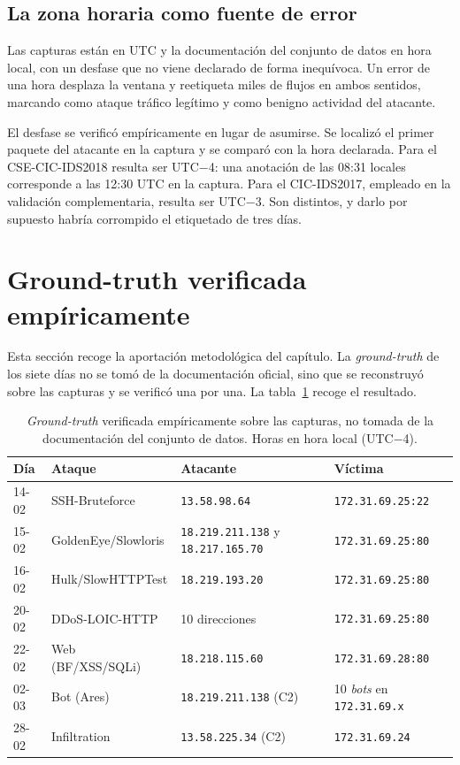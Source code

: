 \subsection*{La zona horaria como fuente de error}

Las capturas están en UTC y la documentación del conjunto de datos en hora local,
con un desfase que no viene declarado de forma inequívoca. Un error de una hora
desplaza la ventana y reetiqueta miles de flujos en ambos sentidos, marcando como
ataque tráfico legítimo y como benigno actividad del atacante.

El desfase se verificó empíricamente en lugar de asumirse. Se localizó el primer
paquete del atacante en la captura y se comparó con la hora declarada. Para el
CSE-CIC-IDS2018 resulta ser UTC$-$4: una anotación de las 08:31
locales corresponde a las 12:30 UTC en la captura. Para el CIC-IDS2017, empleado
en la validación complementaria, resulta ser UTC$-$3. Son distintos, y darlo por
supuesto habría corrompido el etiquetado de tres días.

\section{Ground-truth verificada empíricamente}
\label{sec:ground-truth}

Esta sección recoge la aportación metodológica del capítulo. La
\emph{ground-truth} de los siete días no se tomó de la documentación oficial,
sino que se reconstruyó sobre las capturas y se verificó una por una. La
tabla~\ref{tab:ground-truth} recoge el resultado.

\begin{table}[htbp]
  \centering
  \caption[Ground-truth verificada sobre las capturas]{\emph{Ground-truth}
  verificada empíricamente sobre las capturas, no tomada de la documentación del
  conjunto de datos. Horas en hora local (UTC$-$4).}
  \label{tab:ground-truth}
  \footnotesize
  \begin{tabular}{llll}
    \toprule
    \textbf{Día} & \textbf{Ataque} & \textbf{Atacante} & \textbf{Víctima} \\
    \midrule
    14-02 & SSH-Bruteforce      & \texttt{13.58.98.64}      & \texttt{172.31.69.25:22} \\
    15-02 & GoldenEye/Slowloris & \texttt{18.219.211.138} y \texttt{18.217.165.70} & \texttt{172.31.69.25:80} \\
    16-02 & Hulk/SlowHTTPTest   & \texttt{18.219.193.20}    & \texttt{172.31.69.25:80} \\
    20-02 & DDoS-LOIC-HTTP      & 10 direcciones            & \texttt{172.31.69.25:80} \\
    22-02 & Web (BF/XSS/SQLi)   & \texttt{18.218.115.60}    & \texttt{172.31.69.28:80} \\
    02-03 & Bot (Ares)          & \texttt{18.219.211.138} (C2) & 10 \emph{bots} en \texttt{172.31.69.x} \\
    28-02 & Infiltration        & \texttt{13.58.225.34} (C2)   & \texttt{172.31.69.24} \\
    \bottomrule
  \end{tabular}
\end{table}

